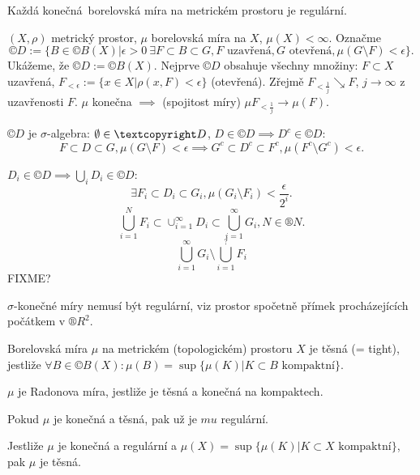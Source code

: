 \documentclass[12pt]{article}					%
\begin{document}
\begin{veta}
	Každá konečná borelovská míra na metrickém prostoru je regulární.

	\begin{dukazin}
		$(X, \rho)$ metrický prostor, $\mu$ borelovská míra na $X$, $\mu(X) < ∞$. Označme
		$$ ©D := \{B \in ©B(X) | \epsilon > 0 \ \exists F \subset B \subset G, F \text{ uzavřená}, G \text{ otevřená}, \mu(G \setminus F) < \epsilon\}. $$
		Ukážeme, že $©D := ©B(X)$. Nejprve $©D$ obsahuje všechny množiny: $F \subset X$ uzavřená, $F_{<\epsilon} := \{x \in X | \rho(x, F) < \epsilon\}$ (otevřená). Zřejmě $F_{<\frac{1}{j}} \searrow F$, $j \rightarrow ∞$ z uzavřenosti $F$. $\mu$ konečna $\implies$ (spojitost míry) $\mu F_{<\frac{1}{j}} \rightarrow \mu(F)$.

		$©D$ je $\sigma$-algebra: $\O \in ©D$, $D \in ©D \implies D^c \in ©D$:
		$$ F \subset D \subset G, \mu(G \setminus F) < \epsilon \implies G^c \subset D^c \subset F^c, \mu(F^c \setminus G^c) < \epsilon. $$

		$D_i \in ©D \implies \bigcup_i D_i \in ©D$:
		$$ \exists F_i \subset D_i \subset G_i, \mu(G_i \setminus F_i) < \frac{\epsilon}{2^i}. $$
		$$ \bigcup_{i=1}^N F_i \subset \cup_{i=1}^∞ D_i \subset \bigcup_{i = 1}^∞ G_i, N \in ®N. $$
		$$ \bigcup_{i=1}^∞ G_i \setminus \bigcup_{i=1}^?F_i $$
		FIXME?
	\end{dukazin}


	\begin{poznamkain}
		$\sigma$-konečné míry nemusí být regulární, viz prostor spočetně přímek procházejících počátkem v $®R^2$.
	\end{poznamkain}
\end{veta}

\begin{definice}[Těsnost (= vnitřní regularita)]
	Borelovská míra $\mu$ na metrickém (topologickém) prostoru $X$ je těsná (= tight), jestliže $\forall B \in ©B(X): \mu(B) = \sup\{\mu(K) | K \subset B \text{ kompaktní}\}$.
\end{definice}

\begin{poznamka}
	$\mu$ je Radonova míra, jestliže je těsná a konečná na kompaktech.

	Pokud $\mu$ je konečná a těsná, pak už je $mu$ regulární.

	Jestliže $\mu$ je konečná a regulární a $\mu(X) = \sup\{\mu(K) | K \subset X \text{ kompaktní}\}$, pak $\mu$ je těsná.
\end{poznamka}
\end{document}
